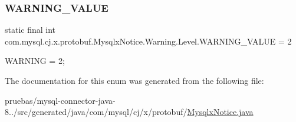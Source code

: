 \subsubsection{\texorpdfstring{W\+A\+R\+N\+I\+N\+G\+\_\+\+V\+A\+L\+UE}{WARNING\_VALUE}}
{\footnotesize\ttfamily  static  final int com.\+mysql.\+cj.\+x.\+protobuf.\+Mysqlx\+Notice.\+Warning.\+Level.\+W\+A\+R\+N\+I\+N\+G\+\_\+\+V\+A\+L\+UE = 2\hspace{0.3cm}{\ttfamily [static]}}

{\ttfamily W\+A\+R\+N\+I\+NG = 2;} 

The documentation for this enum was generated from the following file\+:\begin{DoxyCompactItemize}
\item 
pruebas/mysql-\/connector-\/java-\/8../src/generated/java/com/mysql/cj/x/protobuf/\mbox{\hyperlink{_mysqlx_notice_8java}{Mysqlx\+Notice.\+java}}\end{DoxyCompactItemize}
